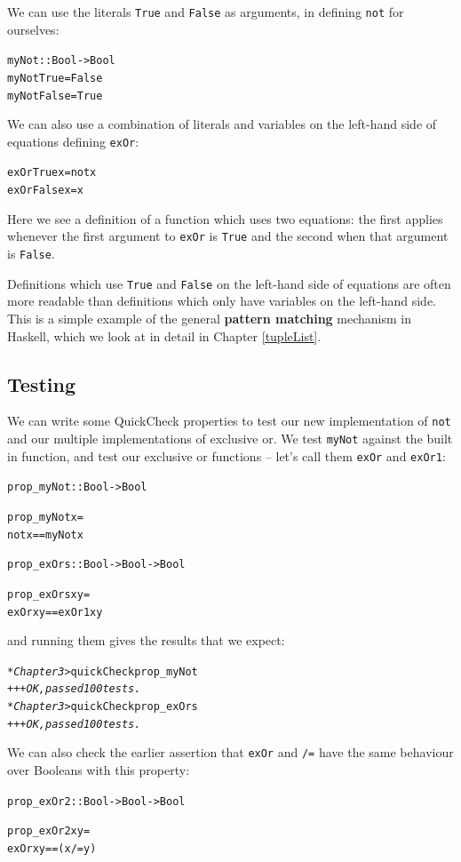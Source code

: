 We can use the literals \texttt{True} and \texttt{False} as arguments, in defining
\texttt{not} for ourselves:
\begin{alltt}
myNot :: Bool -> Bool
myNot True  = False
myNot False = True
\end{alltt}
We can also use a combination of literals and variables on the left-hand side of
equations defining \texttt{exOr}:
\begin{alltt}
exOr True  x = not x
exOr False x = x
\end{alltt}
Here we see a definition of a function which uses two equations: the
first applies whenever the first argument to \texttt{exOr} is
\texttt{True} and the second when that argument is \texttt{False}.

Definitions which use \texttt{True} and \texttt{False} on the left-hand
side of equations are often more readable than definitions which only
have variables on the left-hand side. This is a simple example of the
general \textbf{pattern matching} 
mechanism in Haskell, which we look at
in detail in Chapter \ref{tupleList}.


\subsection*{Testing}

We can write some QuickCheck properties to test our new implementation of \texttt{not} and our multiple implementations of exclusive or. We test \texttt{myNot} against the built in function, and test our exclusive or functions -- let's call them \texttt{exOr} and \texttt{exOr1}:
\begin{alltt}
prop_myNot :: Bool -> Bool

prop_myNot x =
    not x == myNot x

prop_exOrs :: Bool -> Bool -> Bool

prop_exOrs x y =
    exOr x y == exOr1 x y 
\end{alltt}
and running them gives the results that we expect:
\begin{alltt}
\textsl{*Chapter3>} quickCheck prop_myNot
\textsl{+++ OK, passed 100 tests.}
\textsl{*Chapter3>} quickCheck prop_exOrs
\textsl{+++ OK, passed 100 tests.}
\end{alltt}
We can also check the earlier assertion that \texttt{exOr} and \texttt{/=} have the same behaviour over Booleans with this property:
\begin{alltt}
prop_exOr2 :: Bool -> Bool -> Bool

prop_exOr2 x y =
    exOr x y == (x /= y)
\end{alltt}


